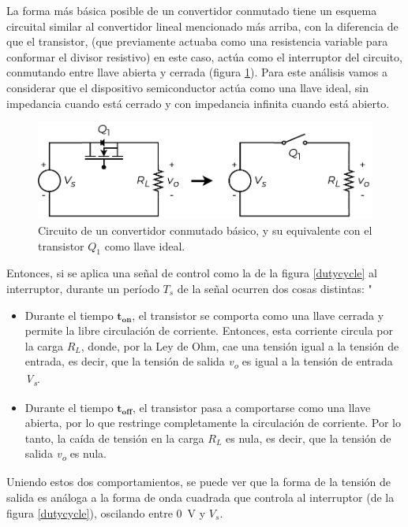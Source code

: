 La forma más básica posible de un convertidor conmutado tiene un esquema circuital similar al convertidor lineal mencionado más arriba, con la diferencia de que el transistor, (que previamente actuaba como una resistencia variable para conformar el divisor resistivo) en este caso, actúa como el interruptor del circuito, conmutando entre llave abierta y cerrada (figura \ref{proto_reductor}). Para este análisis vamos a considerar que el dispositivo semiconductor actúa como una llave ideal, sin impedancia cuando está cerrado y con impedancia infinita cuando está abierto.\\

\begin{figure}[h]
    \centering
    \includegraphics[scale=0.6]{Imagenes/Proto Reductor.pdf}
    \caption{Circuito de un convertidor conmutado básico, y su equivalente con el transistor $Q_1$ como llave ideal.}
    \label{proto_reductor}
\end{figure}

Entonces, si se aplica una señal de control como la de la figura \ref{dutycycle} al interruptor, durante un período $T_s$ de la señal ocurren dos cosas distintas:
"
\begin{itemize}
    \item {\SemiBold Durante el tiempo $\mathbf{t_{on}}$}, el transistor se comporta como una llave cerrada y permite la libre circulación de corriente. Entonces, esta corriente circula por la carga $R_L$, donde, por la Ley de Ohm, cae una tensión igual a la tensión de entrada, es decir, que la tensión de salida {\Medium \textit{v\textsubscript{o}} es igual a la tensión de entrada \textit{V\textsubscript{s}}}.
    \item {\SemiBold Durante el tiempo $\mathbf{t_{off}}$}, el transistor pasa a comportarse como una llave abierta, por lo que restringe completamente la circulación de corriente. Por lo tanto, la caída de tensión en la carga $R_L$ es nula, es decir, que la tensión de salida {\Medium \textit{v\textsubscript{o}} es nula}.
\end{itemize}

Uniendo estos dos comportamientos, se puede ver que la forma de la tensión de salida es análoga a la forma de onda cuadrada que controla al interruptor (de la figura \ref{dutycycle}), oscilando entre \SI{0}{\volt} y $V_s$.

